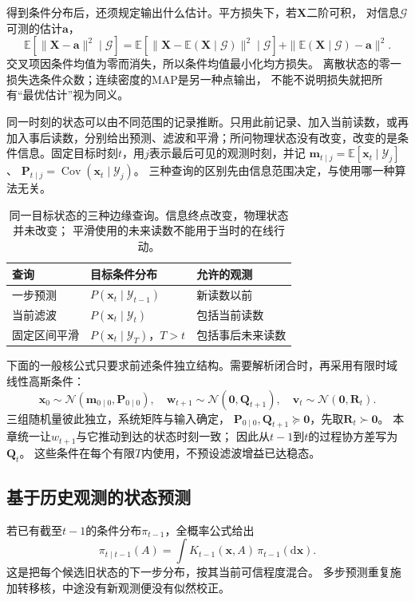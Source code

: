 得到条件分布后，还须规定输出什么估计。平方损失下，若$\bm X$二阶可积，
对信息$\mathcal G$可测的估计$\bm a$，
\[
 \mathbb E[\|\bm X-\bm a\|^2\mid\mathcal G]
 =\mathbb E[\|\bm X-\mathbb E(\bm X\mid\mathcal G)\|^2\mid\mathcal G]
       +\|\mathbb E(\bm X\mid\mathcal G)-\bm a\|^2.
\]
交叉项因条件均值为零而消失，所以条件均值最小化均方损失。
离散状态的零一损失选条件众数；连续密度的MAP是另一种点输出，
不能不说明损失就把所有“最优估计”视为同义。

\label{sec:dynamical-kalman-rts}

同一时刻的状态可以由不同范围的记录推断。只用此前记录、加入当前读数，或再加入事后读数，分别给出预测、滤波和平滑；所问物理状态没有改变，改变的是条件信息。固定目标时刻$t$，用$j$表示最后可见的观测时刻，并记
$\bm m_{t\mid j}=\mathbb E[\bm x_t\mid\mathcal Y_j]$、
$\bm P_{t\mid j}=\operatorname{Cov}(\bm x_t\mid\mathcal Y_j)$。
三种查询的区别先由信息范围决定，与使用哪一种算法无关。

\begin{table}[htbp]
 \centering
 \begin{tabularx}{\linewidth}{lXX}
 \toprule
 查询 & 目标条件分布 & 允许的观测\\
 \midrule
 一步预测 & $P(\bm x_t\mid\mathcal Y_{t-1})$ & 新读数以前\\
 当前滤波 & $P(\bm x_t\mid\mathcal Y_t)$ & 包括当前读数\\
 固定区间平滑 & $P(\bm x_t\mid\mathcal Y_T)$，$T>t$ & 包括事后未来读数\\
 \bottomrule
 \end{tabularx}
 \caption{同一目标状态的三种边缘查询。信息终点改变，物理状态并未改变；
 平滑使用的未来读数不能用于当时的在线行动。}
 \label{tab:dynamical-estimation-information}
\end{table}

下面的一般核公式只要求前述条件独立结构。需要解析闭合时，再采用有限时域
线性高斯条件：
\[
 \bm x_0\sim\mathcal N(\bm m_{0\mid0},\bm P_{0\mid0}),\quad
 \bm w_{t+1}\sim\mathcal N(\bm0,\bm Q_{t+1}),\quad
 \bm v_t\sim\mathcal N(\bm0,\bm R_t).
\]
三组随机量彼此独立，系统矩阵与输入确定，
$\bm P_{0\mid0},\bm Q_{t+1}\succeq\bm0$，先取$\bm R_t\succ\bm0$。
本章统一让$w_{t+1}$与它推动到达的状态时刻一致；
因此从$t-1$到$t$的过程协方差写为$\bm Q_t$。
这些条件在每个有限$T$内使用，不预设滤波增益已达稳态。

\subsection{基于历史观测的状态预测}
若已有截至$t-1$的条件分布$\pi_{t-1}$，全概率公式给出
\begin{equation}
 \pi_{t\mid t-1}(A)
     =\int K_{t-1}(\bm x,A)\,\pi_{t-1}(\mathrm d\bm x).
 \label{eq:dynamical-general-prediction-kernel}
\end{equation}
这是把每个候选旧状态的下一步分布，按其当前可信程度混合。
多步预测重复施加转移核，中途没有新观测便没有似然校正。


